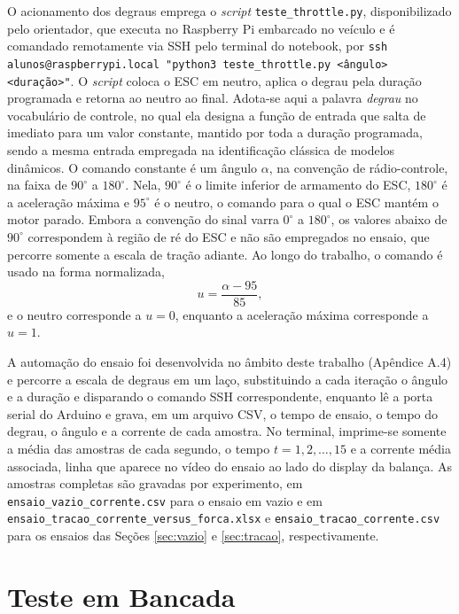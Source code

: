 O acionamento dos degraus emprega o \emph{script} \texttt{teste\_throttle.py},
disponibilizado pelo orientador, que executa no Raspberry Pi embarcado no veículo e é
comandado remotamente via SSH pelo terminal do notebook, por \texttt{ssh
alunos@raspberrypi.local "python3 teste\_throttle.py <ângulo> <duração>"}. O \emph{script}
coloca o ESC em neutro, aplica o degrau pela duração programada e retorna ao neutro ao
final. Adota-se aqui a palavra \emph{degrau} no vocabulário de controle, no qual ela
designa a função de entrada que salta de imediato para um valor constante, mantido por
toda a duração programada, sendo a mesma entrada empregada na identificação clássica de
modelos dinâmicos. O comando constante é um ângulo $\alpha$, na convenção de rádio-controle,
na faixa de $90^\circ$ a $180^\circ$. Nela, $90^\circ$ é o limite inferior de armamento do
ESC, $180^\circ$ é a aceleração máxima e $95^\circ$ é o neutro, o comando para o qual o ESC
mantém o motor parado. Embora a convenção do sinal varra $0^\circ$ a $180^\circ$, os valores
abaixo de $90^\circ$ correspondem à região de ré do ESC e não são empregados no ensaio, que
percorre somente a escala de tração adiante. Ao longo do trabalho, o comando é usado na
forma normalizada,
\begin{equation}\label{eq:normalizacao}
u = \frac{\alpha - 95}{85},
\end{equation}
e o neutro corresponde a $u = 0$, enquanto a aceleração
máxima corresponde a $u = 1$.

A automação do ensaio foi desenvolvida no âmbito deste trabalho (Apêndice A.4) e percorre a escala de
degraus em um laço, substituindo a cada iteração o ângulo e a duração e disparando o comando
SSH correspondente, enquanto lê a porta serial do Arduino e grava, em um arquivo CSV,
o tempo de ensaio, o tempo do degrau, o ângulo e a corrente de cada amostra. No terminal, 
imprime-se somente a média das amostras de cada segundo, o
tempo $t = 1, 2, \ldots, 15$ e a corrente média associada, linha que aparece no vídeo do
ensaio ao lado do display da balança. As amostras completas são gravadas por experimento,
em \texttt{ensaio\_vazio\_corrente.csv} para o ensaio em vazio e em
\texttt{ensaio\_tracao\_corrente\_versus\_forca.xlsx} e
\texttt{ensaio\_tracao\_corrente.csv} para os ensaios das Seções
\ref{sec:vazio} e \ref{sec:tracao}, respectivamente.

\section{Teste em Bancada}
\label{sec:bancada}

